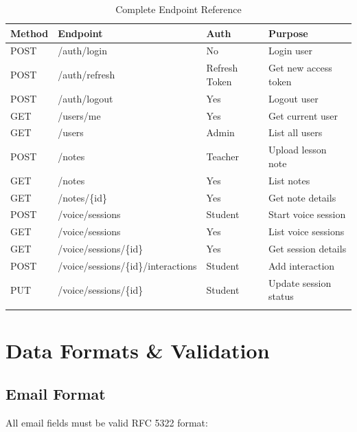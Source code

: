 \documentclass[12pt,a4paper,oneside]{article}
\begin{document}
\begin{table}[H]
\centering
\small
\begin{longtable}{|l|l|l|l|}
\hline
\textbf{Method} & \textbf{Endpoint} & \textbf{Auth} & \textbf{Purpose} \\
\hline
\endhead

POST & /auth/login & No & Login user \\
\hline
POST & /auth/refresh & Refresh Token & Get new access token \\
\hline
POST & /auth/logout & Yes & Logout user \\
\hline
GET & /users/me & Yes & Get current user \\
\hline
GET & /users & Admin & List all users \\
\hline
POST & /notes & Teacher & Upload lesson note \\
\hline
GET & /notes & Yes & List notes \\
\hline
GET & /notes/\{id\} & Yes & Get note details \\
\hline
POST & /voice/sessions & Student & Start voice session \\
\hline
GET & /voice/sessions & Yes & List voice sessions \\
\hline
GET & /voice/sessions/\{id\} & Yes & Get session details \\
\hline
POST & /voice/sessions/\{id\}/interactions & Student & Add interaction \\
\hline
PUT & /voice/sessions/\{id\} & Student & Update session status \\
\hline

\caption{Complete Endpoint Reference}
\end{longtable}
\end{table}

\newpage

\section{Data Formats \& Validation}

\subsection{Email Format}

All email fields must be valid RFC 5322 format:
\end{document}
